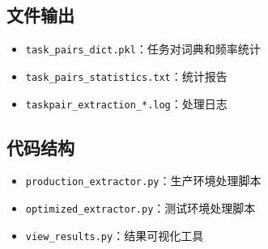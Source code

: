 \documentclass[11pt,a4paper]{article}
\begin{document}
\subsection{文件输出}

\begin{itemize}
    \item \texttt{task\_pairs\_dict.pkl}：任务对词典和频率统计
    \item \texttt{task\_pairs\_statistics.txt}：统计报告
    \item \texttt{taskpair\_extraction\_*.log}：处理日志
\end{itemize}

\subsection{代码结构}

\begin{itemize}
    \item \texttt{production\_extractor.py}：生产环境处理脚本
    \item \texttt{optimized\_extractor.py}：测试环境处理脚本
    \item \texttt{view\_results.py}：结果可视化工具
\end{itemize}
\end{document}
